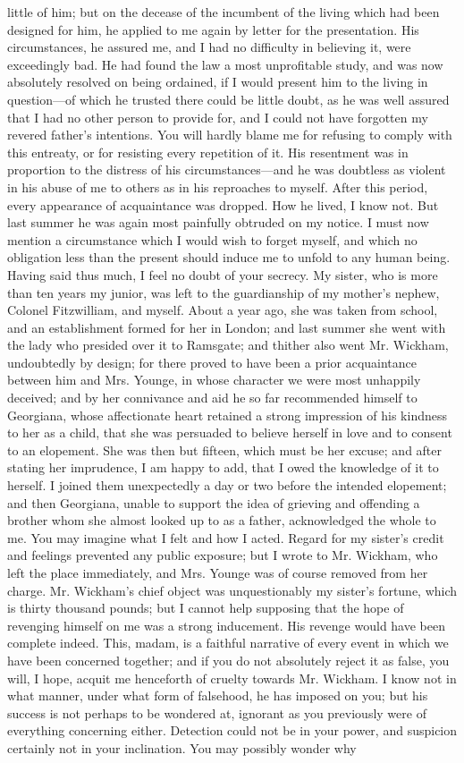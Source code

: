 little of him; but on the decease of the incumbent of the living which had been designed for him, he applied to me again by letter for the presentation. His circumstances, he assured me, and I had no difficulty in believing it, were exceedingly bad. He had found the law a most unprofitable study, and was now absolutely resolved on being ordained, if I would present him to the living in question---of which he trusted there could be little doubt, as he was well assured that I had no other person to provide for, and I could not have forgotten my revered father's intentions. You will hardly blame me for refusing to comply with this entreaty, or for resisting every repetition of it. His resentment was in proportion to the distress of his circumstances---and he was doubtless as violent in his abuse of me to others as in his reproaches to myself. After this period, every appearance of acquaintance was dropped. How he lived, I know not. But last summer he was again most painfully obtruded on my notice. I must now mention a circumstance which I would wish to forget myself, and which no obligation less than the present should induce me to unfold to any human being. Having said thus much, I feel no doubt of your secrecy. My sister, who is more than ten years my junior, was left to the guardianship of my mother's nephew, Colonel Fitzwilliam, and myself. About a year ago, she was taken from school, and an establishment formed for her in London; and last summer she went with the lady who presided over it to Ramsgate; and thither also went Mr. Wickham, undoubtedly by design; for there proved to have been a prior acquaintance between him and Mrs. Younge, in whose character we were most unhappily deceived; and by her connivance and aid he so far recommended himself to Georgiana, whose affectionate heart retained a strong impression of his kindness to her as a child, that she was persuaded to believe herself in love and to consent to an elopement. She was then but fifteen, which must be her excuse; and after stating her imprudence, I am happy to add, that I owed the knowledge of it to herself. I joined them unexpectedly a day or two before the intended elopement; and then Georgiana, unable to support the idea of grieving and offending a brother whom she almost looked up to as a father, acknowledged the whole to me. You may imagine what I felt and how I acted. Regard for my sister's credit and feelings prevented any public exposure; but I wrote to Mr. Wickham, who left the place immediately, and Mrs. Younge was of course removed from her charge. Mr. Wickham's chief object was unquestionably my sister's fortune, which is thirty thousand pounds; but I cannot help supposing that the hope of revenging himself on me was a strong inducement. His revenge would have been complete indeed. This, madam, is a faithful narrative of every event in which we have been concerned together; and if you do not absolutely reject it as false, you will, I hope, acquit me henceforth of cruelty towards Mr. Wickham. I know not in what manner, under what form of falsehood, he has imposed on you; but his success is not perhaps to be wondered at, ignorant as you previously were of everything concerning either. Detection could not be in your power, and suspicion certainly not in your inclination. You may possibly wonder why 